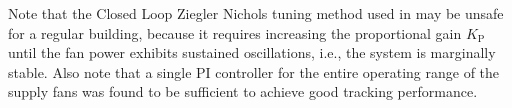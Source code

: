 Note that the Closed Loop Ziegler Nichols tuning method used in \cite{Vrettos:2016flexlab1} may be unsafe for a regular building, because it requires increasing the proportional gain $K_\text{P}$ until the fan power exhibits sustained oscillations, i.e., the system is marginally stable.
Also note that a single PI controller for the entire operating range of the supply fans was found to be sufficient to achieve good tracking performance.















